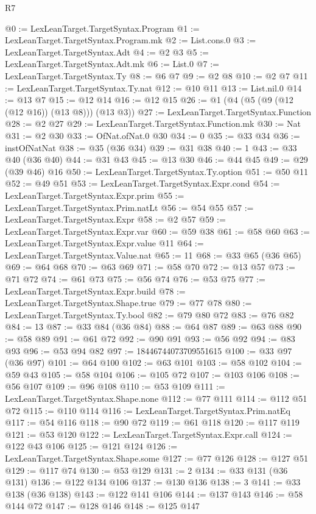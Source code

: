 \begin{lexlean}{R7}
\begin{coremodule}
@0 := LexLeanTarget.TargetSyntax.Program
@1 := LexLeanTarget.TargetSyntax.Program.mk
@2 := List.cons.{0}
@3 := LexLeanTarget.TargetSyntax.Adt
@4 := @2 @3
@5 := LexLeanTarget.TargetSyntax.Adt.mk
@6 := List.{0}
@7 := LexLeanTarget.TargetSyntax.Ty
@8 := @6 @7
@9 := @2 @8
@10 := @2 @7
@11 := LexLeanTarget.TargetSyntax.Ty.nat
@12 := @10 @11
@13 := List.nil.{0}
@14 := @13 @7
@15 := @12 @14
@16 := @12 @15
@26 := @1 (@4 (@5 (@9 (@12 (@12 @16)) (@13 @8))) (@13 @3))
@27 := LexLeanTarget.TargetSyntax.Function
@28 := @2 @27
@29 := LexLeanTarget.TargetSyntax.Function.mk
@30 := Nat
@31 := @2 @30
@33 := OfNat.ofNat.{0} @30
@34 := 0
@35 := @33 @34
@36 := instOfNatNat
@38 := @35 (@36 @34)
@39 := @31 @38
@40 := 1
@43 := @33 @40 (@36 @40)
@44 := @31 @43
@45 := @13 @30
@46 := @44 @45
@49 := @29 (@39 @46) @16
@50 := LexLeanTarget.TargetSyntax.Ty.option
@51 := @50 @11
@52 := @49 @51
@53 := LexLeanTarget.TargetSyntax.Expr.cond
@54 := LexLeanTarget.TargetSyntax.Expr.prim
@55 := LexLeanTarget.TargetSyntax.Prim.natLt
@56 := @54 @55
@57 := LexLeanTarget.TargetSyntax.Expr
@58 := @2 @57
@59 := LexLeanTarget.TargetSyntax.Expr.var
@60 := @59 @38
@61 := @58 @60
@63 := LexLeanTarget.TargetSyntax.Expr.value @11
@64 := LexLeanTarget.TargetSyntax.Value.nat
@65 := 11
@68 := @33 @65 (@36 @65)
@69 := @64 @68
@70 := @63 @69
@71 := @58 @70
@72 := @13 @57
@73 := @71 @72
@74 := @61 @73
@75 := @56 @74
@76 := @53 @75
@77 := LexLeanTarget.TargetSyntax.Expr.build
@78 := LexLeanTarget.TargetSyntax.Shape.true
@79 := @77 @78
@80 := LexLeanTarget.TargetSyntax.Ty.bool
@82 := @79 @80 @72
@83 := @76 @82
@84 := 13
@87 := @33 @84 (@36 @84)
@88 := @64 @87
@89 := @63 @88
@90 := @58 @89
@91 := @61 @72
@92 := @90 @91
@93 := @56 @92
@94 := @83 @93
@96 := @53 @94 @82
@97 := 18446744073709551615
@100 := @33 @97 (@36 @97)
@101 := @64 @100
@102 := @63 @101
@103 := @58 @102
@104 := @59 @43
@105 := @58 @104
@106 := @105 @72
@107 := @103 @106
@108 := @56 @107
@109 := @96 @108
@110 := @53 @109
@111 := LexLeanTarget.TargetSyntax.Shape.none
@112 := @77 @111
@114 := @112 @51 @72
@115 := @110 @114
@116 := LexLeanTarget.TargetSyntax.Prim.natEq
@117 := @54 @116
@118 := @90 @72
@119 := @61 @118
@120 := @117 @119
@121 := @53 @120
@122 := LexLeanTarget.TargetSyntax.Expr.call
@124 := @122 @43 @106
@125 := @121 @124
@126 := LexLeanTarget.TargetSyntax.Shape.some
@127 := @77 @126
@128 := @127 @51
@129 := @117 @74
@130 := @53 @129
@131 := 2
@134 := @33 @131 (@36 @131)
@136 := @122 @134 @106
@137 := @130 @136
@138 := 3
@141 := @33 @138 (@36 @138)
@143 := @122 @141 @106
@144 := @137 @143
@146 := @58 @144 @72
@147 := @128 @146
@148 := @125 @147

\end{coremodule}
\end{lexlean}
